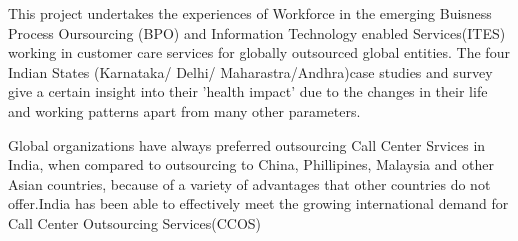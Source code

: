 This project undertakes the experiences of Workforce in the emerging Buisness Process Oursourcing (BPO) and Information Technology enabled Services(ITES) working in customer care services for globally outsourced global entities. The four Indian States (Karnataka/ Delhi/ Maharastra/Andhra)case studies and survey give a certain insight into their 'health impact' due to the changes in their life and working patterns apart from many other parameters.

Global organizations have always preferred outsourcing Call Center Srvices in India, when compared to outsourcing to China, Phillipines, Malaysia and other Asian countries, because of a variety of advantages that other countries do not offer.India has been able to effectively meet the growing international demand for Call Center Outsourcing Services(CCOS)  